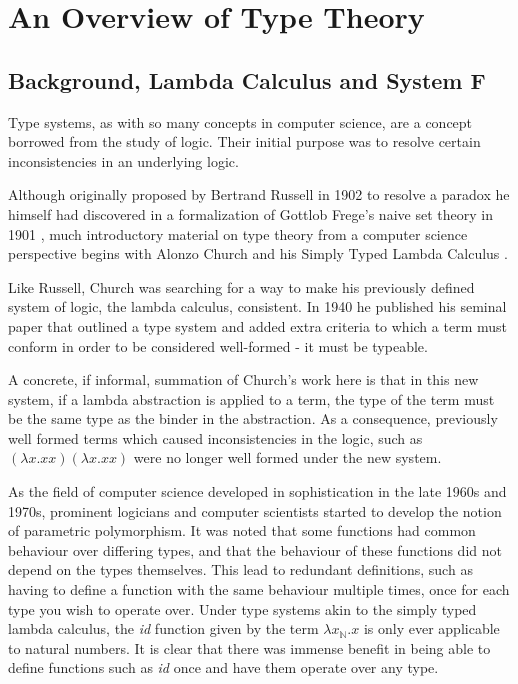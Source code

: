 \chapter{An Overview of Type Theory}

        \section{Background, Lambda Calculus and System F}

          Type systems, as with so many concepts in computer science,
          are a concept borrowed from the study of logic. Their initial
          purpose was to resolve certain inconsistencies in an
          underlying logic. 
      
          Although originally proposed by Bertrand Russell in 1902 to
          resolve a paradox he himself had discovered in a formalization of
          Gottlob Frege's naive set theory in 1901 \cite{Russell1901}, much
          introductory material on type theory from a computer science
          perspective begins with Alonzo Church and his Simply Typed
          Lambda Calculus \cite{church1940}.
          
          Like Russell, Church was searching for a way to make his
          previously defined system of logic, the lambda calculus,
          consistent. In 1940 he published his seminal paper that outlined a
          type system and added extra criteria to which a term must
          conform in order to be considered well-formed - it must be typeable.
      
          A concrete, if informal, summation of Church's work here is that
          in this new system, if a lambda abstraction is applied to a term,
          the type of the term must be the same type as the binder in the
          abstraction. As a consequence, previously well formed terms which
          caused inconsistencies in the logic, such as
          $ (\lambda x.xx)(\lambda x.xx)  $
          were no longer well formed under the new system.
      
          As the field of computer science developed in sophistication in
          the late 1960s and 1970s, prominent logicians and computer
          scientists started to develop the notion of parametric
          polymorphism. It was noted that some functions had common
          behaviour over differing types, and that the behaviour of these
          functions did not depend on the types themselves. This lead to
          redundant definitions, such as having to define a function with the
          same behaviour multiple times, once for each type you wish to
          operate over. Under type systems akin to the simply typed lambda
          calculus, the \emph{id} function given by the term $\lambda
          x_{\mathbb{N}}.x $ is only ever applicable to natural numbers. It
          is clear that there was immense benefit in being able to define
          functions such as \emph{id} once and have them operate over any type.
      
